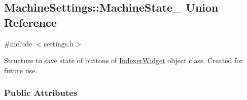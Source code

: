 \hypertarget{unionMachineSettings_1_1MachineState__}{}\subsection{Machine\+Settings\+:\+:Machine\+State\+\_\+ Union Reference}
\label{unionMachineSettings_1_1MachineState__}


{\ttfamily \#include $<$settings.\+h$>$}

Structure to save state of buttons of \hyperlink{classIndexerWidget}{Indexer\+Widget} object class. Created for future use.

\subsubsection*{Public Attributes}
